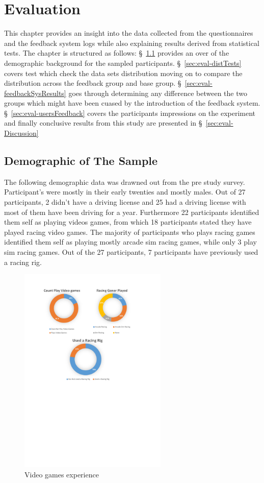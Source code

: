\chapter{Evaluation}
This chapter provides an insight into the data collected from the questionnaires and the feedback system logs while also explaining results derived from statistical tests. The chapter is structured as follows: \S~\ref{sec:eval-demographic} provides an over of the demographic background for the sampled participants. \S~\ref{sec:eval-distTests} covers test which check the data sets distribution moving on to compare the distribution across the feedback group and base group. \S~\ref{sec:eval-feedbackSysResults} goes through determining any difference between the two groups which might have been cuased by the introduction of the feedback system.  \S~\ref{sec:eval-usersFeedback} covers the participants impressions on the experiment and finally conclusive results from this study are presented in \S~\ref{sec:eval-Discussion} 

\section{Demographic of The Sample}
\label{sec:eval-demographic}

The following demographic data was drawned out from the pre study survey. Participant's were mostly in their early twenties and mostly males. Out of 27 participants, 2 didn't have a driving license and 25 had a driving license with most of them have been driving for a year. Furthermore 22 participants identified them self as playing videos games, from which 18 participants stated they have played racing video games. The majority of participants who plays racing games identified them self as playing mostly arcade sim racing games, while only 3 play sim racing games. Out of the 27 participants, 7 participants have previously used a racing rig.


\begin{figure}[!htb]
	\centering
	\includegraphics[height=10cm]{charts/gamesxp.pdf}
	\caption[Gaming xp]{Video games experience}
	\label{fig:chart-gamesxp}
\end{figure}


